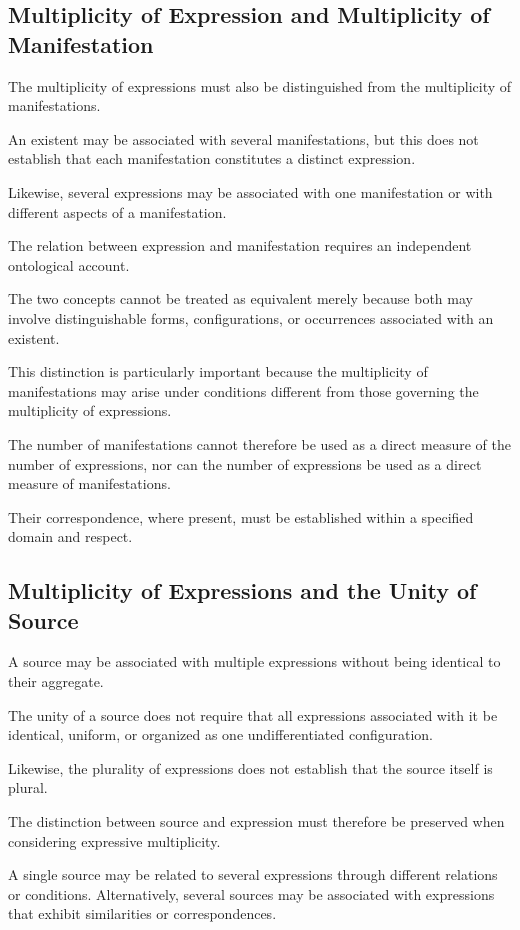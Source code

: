\subsection{Multiplicity of Expression and Multiplicity of Manifestation}

The multiplicity of expressions must also
be distinguished from the multiplicity of
manifestations.

An existent may be associated with several
manifestations, but this does not establish
that each manifestation constitutes a distinct
expression.

Likewise, several expressions may be associated
with one manifestation or with different
aspects of a manifestation.

The relation between expression and manifestation
requires an independent ontological account.

The two concepts cannot be treated as equivalent
merely because both may involve distinguishable
forms, configurations, or occurrences associated
with an existent.

This distinction is particularly important
because the multiplicity of manifestations
may arise under conditions different from
those governing the multiplicity of expressions.

The number of manifestations cannot therefore
be used as a direct measure of the number
of expressions, nor can the number of expressions
be used as a direct measure of manifestations.

Their correspondence, where present, must
be established within a specified domain
and respect.

\subsection{Multiplicity of Expressions and the Unity of Source}

A source may be associated with multiple
expressions without being identical to their
aggregate.

The unity of a source does not require that
all expressions associated with it be identical,
uniform, or organized as one undifferentiated
configuration.

Likewise, the plurality of expressions does
not establish that the source itself is plural.

The distinction between source and expression
must therefore be preserved when considering
expressive multiplicity.

A single source may be related to several
expressions through different relations or
conditions. Alternatively, several sources
may be associated with expressions that
exhibit similarities or correspondences.

